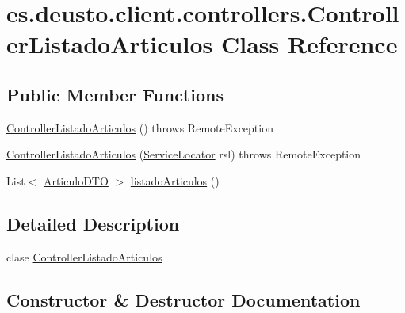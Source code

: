 \hypertarget{classes_1_1deusto_1_1client_1_1controllers_1_1_controller_listado_articulos}{}\section{es.\+deusto.\+client.\+controllers.\+Controller\+Listado\+Articulos Class Reference}
\label{classes_1_1deusto_1_1client_1_1controllers_1_1_controller_listado_articulos}
\subsection*{Public Member Functions}
\begin{DoxyCompactItemize}
\item 
\mbox{\hyperlink{classes_1_1deusto_1_1client_1_1controllers_1_1_controller_listado_articulos_a8e19668230b5a6c85b9f600a2cfbc6b8}{Controller\+Listado\+Articulos}} ()  throws Remote\+Exception 
\item 
\mbox{\hyperlink{classes_1_1deusto_1_1client_1_1controllers_1_1_controller_listado_articulos_a66732a70252ca879d59c9aae471d30dc}{Controller\+Listado\+Articulos}} (\mbox{\hyperlink{classes_1_1deusto_1_1client_1_1remote_1_1_service_locator}{Service\+Locator}} rsl)  throws Remote\+Exception 
\item 
List$<$ \mbox{\hyperlink{classes_1_1deusto_1_1server_1_1dto_1_1_articulo_d_t_o}{Articulo\+D\+TO}} $>$ \mbox{\hyperlink{classes_1_1deusto_1_1client_1_1controllers_1_1_controller_listado_articulos_a04a9aa315bc43a2d6ac62cea16277f26}{listado\+Articulos}} ()
\end{DoxyCompactItemize}


\subsection{Detailed Description}
clase \mbox{\hyperlink{classes_1_1deusto_1_1client_1_1controllers_1_1_controller_listado_articulos}{Controller\+Listado\+Articulos}} 

\subsection{Constructor \& Destructor Documentation}
\mbox{\label{classes_1_1deusto_1_1client_1_1controllers_1_1_controller_listado_articulos_a8e19668230b5a6c85b9f600a2cfbc6b8}} 
